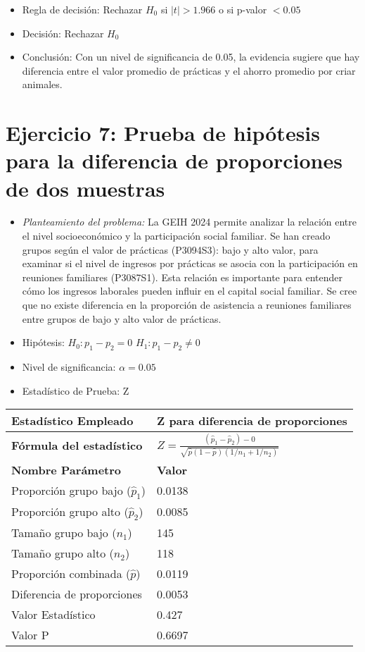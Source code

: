 \documentclass[12pt,a4paper]{article}
\begin{document}
\begin{itemize}
    \item Regla de decisión: Rechazar $H_0$ si $|t| > 1.966$ o si p-valor $< 0.05$
    \item Decisión: Rechazar $H_0$
    \item Conclusión: Con un nivel de significancia de 0.05, la evidencia sugiere que hay diferencia entre el valor promedio de prácticas y el ahorro promedio por criar animales.
\end{itemize}

\section*{Ejercicio 7: Prueba de hipótesis para la diferencia de proporciones de dos muestras}
\begin{itemize}
    \item \textit{Planteamiento del problema:} La GEIH 2024 permite analizar la relación entre el nivel socioeconómico y la participación social familiar. Se han creado grupos según el valor de prácticas (P3094S3): bajo y alto valor, para examinar si el nivel de ingresos por prácticas se asocia con la participación en reuniones familiares (P3087S1). Esta relación es importante para entender cómo los ingresos laborales pueden influir en el capital social familiar. Se cree que no existe diferencia en la proporción de asistencia a reuniones familiares entre grupos de bajo y alto valor de prácticas.
    \item Hipótesis: \quad $H_{0}: p_1 - p_2 = 0$ \hspace{2cm} $H_{1}: p_1 - p_2 \neq 0$
    \item Nivel de significancia: $\alpha = 0.05$
    \item Estadístico de Prueba: Z
\end{itemize}

\begin{tabular}{|m{7cm}|m{7cm}|}
\hline
\textbf{Estadístico Empleado} & Z para diferencia de proporciones \\ \hline
\textbf{Fórmula del estadístico} & $Z = \frac{(\hat{p}_1 - \hat{p}_2) - 0}{\sqrt{\hat{p}(1-\hat{p})(1/n_1 + 1/n_2)}}$ \\ \hline
\textbf{Nombre Parámetro} & \textbf{Valor} \\ \hline
Proporción grupo bajo ($\hat{p}_1$) & 0.0138 \\ \hline
Proporción grupo alto ($\hat{p}_2$) & 0.0085 \\ \hline
Tamaño grupo bajo ($n_1$) & 145 \\ \hline
Tamaño grupo alto ($n_2$) & 118 \\ \hline
Proporción combinada ($\hat{p}$) & 0.0119 \\ \hline
Diferencia de proporciones & 0.0053 \\ \hline
Valor Estadístico & 0.427 \\ \hline
Valor P & 0.6697 \\ \hline
\end{tabular}
\end{document}
